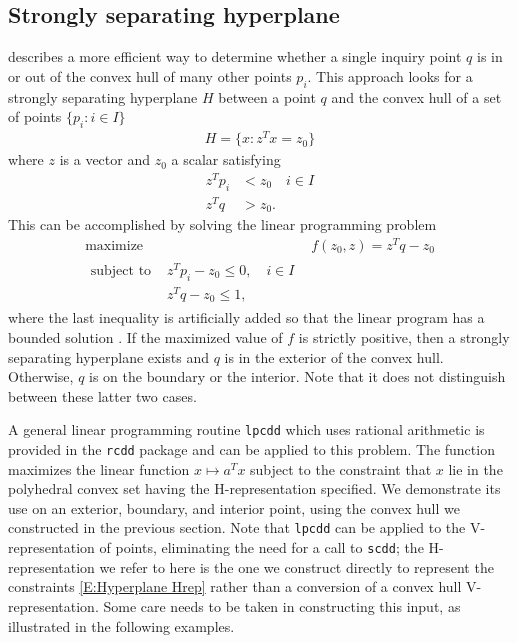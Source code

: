 \subsection{Strongly separating hyperplane} \label{S:Strong H}
\citet{Fukuda:2008} describes a more efficient way to determine whether a single 
inquiry point $q$ is in or out of the convex hull of many other points $p_i$.  
This approach looks for a strongly separating hyperplane $H$ between a 
point $q$ and the convex hull of a set of points $\{p_i : i \in I\}$
\begin{align*}
	H = \{x : z^T x = z_0\}
\end{align*}
where $z$ is a vector and $z_0$ a scalar satisfying
\begin{align*}
		z^T p_i &< z_0 \quad i \in I \\
		z^Tq &> z_0.
\end{align*}
This can be accomplished by solving the linear programming problem
\begin{align}
	\text{maximize } 	&f(z_0, z) = z^Tq - z_0 \label{E:Hyperplane objv}\\  
	\begin{split}
	\text{subject to } 	&z^T p_i - z_0 \leq 0, \quad i \in I \label{E:Hyperplane Hrep}\\ 
						&z^Tq - z_0 \leq 1, 
	\end{split}
\end{align}
where the last inequality is artificially added so that the linear program 
has a bounded solution \citep{Fukuda:2008,rcdd:R}.  If the maximized value of 
$f$ is strictly positive, then a strongly separating hyperplane exists and 
$q$ is in the exterior of the convex hull.  Otherwise, $q$ is on the boundary or 
the interior.  Note that it does not distinguish between these latter two cases.

A general linear programming routine \texttt{lpcdd} which uses 
rational arithmetic is provided in the \texttt{rcdd} package and can be applied  
to this problem.  The function maximizes the linear function $x \mapsto a^T x$ 
subject to the constraint that $x$ lie in the polyhedral convex set having 
the H-representation specified.  
We demonstrate its use on an exterior, boundary, and interior
point, using the convex hull we constructed in the previous section.  Note that \texttt{lpcdd} can be applied to the V-representation of points, eliminating
the need for a call to \texttt{scdd}; the H-representation we refer to here is the one we
construct directly to represent the constraints \eqref{E:Hyperplane Hrep}
rather than a conversion of a convex hull V-representation.  Some care needs to
be taken in constructing this input, as illustrated in the following examples.
